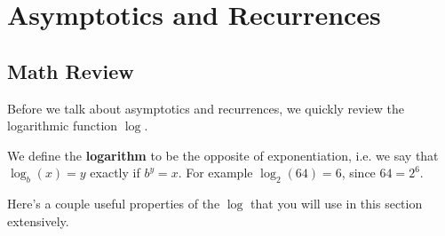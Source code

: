 \section{Asymptotics and Recurrences}


\subsection{Math Review}

Before we talk about asymptotics and recurrences, we quickly review the
logarithmic function $\log$.

\begin{definition*}
We define the \textbf{logarithm} to be the opposite of exponentiation, i.e. we
say that $\log_b(x) = y$ exactly if $b^y = x$. For example $\log_2(64) = 6$,
since $64 = 2^6$. 
\end{definition*}

Here's a couple useful properties of the $\log$ that you will use in this
section extensively.

